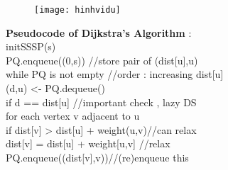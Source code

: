 \documentclass{article}
\begin{document}
	\begin{flushleft}
		\begin{figure}[!ht]
			\centering
			\texttt{[image: hinhvidu]}
		\end{figure}
			\bigskip
			\hspace{0.86cm}\textbf{Pseudocode of Dijkstra's Algorithm} :\\
			initSSSP(s)\\
			PQ.enqueue((0,s))	\hspace{0.5cm}	//store pair of (dist[u],u)\\
			while PQ is not empty 	\hspace{0.5cm}//order : increasing dist[u] \\
			\hspace{0.5cm}(d,u) <- PQ.dequeue()\\
			\hspace{0.5cm}if d == dist[u]\hspace{0.5cm}	//important check , lazy DS \\
			\hspace{1cm}for each vertex v adjacent to u \\
			\hspace{1.5cm}if dist[v] > dist[u] + weight(u,v)\hspace{0.5cm}//can relax \\
			\hspace{2cm}dist[v] = dist[u] + weight[u,v]	\hspace{0.5cm}//relax \\
			\hspace{2cm}PQ.enqueue((dist[v],v))\hspace{0.5cm}//(re)enqueue this\\			
	\end{flushleft}
\end{document}
